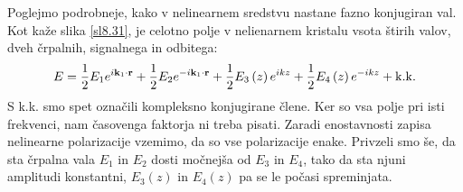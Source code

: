 Poglejmo podrobneje, kako v nelinearnem sredstvu nastane fazno konjugiran
val. Kot kaže slika \ref{sl8.31}, je celotno polje v nelienarnem
kristalu vsota štirih valov, dveh črpalnih, signalnega in odbitega:
\begin{equation}
E=\frac{1}{2}E_{1}e^{i{\bf k}_{1}\cdot{\bf r}}+\frac{1}{2}E_{2}e^{-i{\bf k}_{1}\cdot{\bf r}}+\frac{1}{2}E_{3}\left(z\right)e^{ikz}+\frac{1}{2}E_{4}\left(z\right)e^{-ikz}+{\rm k.k.}\label{8.99}
\end{equation}
 S k.k. smo spet označili kompleksno konjugirane člene. Ker so vsa
polje pri isti frekvenci, nam časovenga faktorja ni treba pisati.
Zaradi enostavnosti zapisa nelinearne polarizacije vzemimo, da so
vse polarizacije enake. Privzeli smo še, da sta črpalna vala $E_{1}$
in $E_{2}$ dosti močnejša od $E_{3}$ in $E_{4}$, tako da sta njuni
amplitudi konstantni, $E_{3}\left(z\right)$ in $E_{4}\left(z\right)$
pa se le počasi spreminjata.

